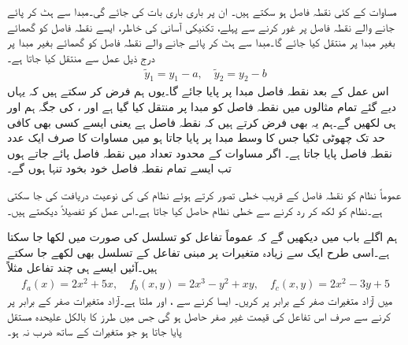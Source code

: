 مساوات  کے کئی نقطہ فاصل ہو سکتے ہیں۔ ان پر باری باری بات کی جائے گی۔مبدا سے ہٹ کر پائے جانے والے نقطہ فاصل پر غور کرنے سے پہلے، تکنیکی آسانی کی خاطر، ایسے نقطہ فاصل کو گھمائے بغیر  مبدا پر منتقل کیا جائے گا۔مبدا  سے ہٹ کر پائے جانے والے نقطہ فاصل  کو گھمائے بغیر  مبدا  پر درج ذیل عمل سے منتقل کیا جاتا ہے۔
\begin{align*}
\tilde{y}_1=y_1-a,\quad \tilde{y}_2=y_2-b
\end{align*}
اس عمل کے بعد نقطہ فاصل  مبدا  پر پایا جائے گا۔یوں ہم فرض کر سکتے ہیں کہ یہاں دیے گئے تمام مثالوں میں نقطہ  فاصل کو مبدا پر منتقل کیا گیا ہے اور  ،  کی جگہ ہم  اور  ہی لکھیں گے۔ہم یہ بھی فرض کرتے ہیں کہ نقطہ فاصل   ہے یعنی ایسے کسی بھی کافی حد تک چھوٹی ٹکیا جس کا وسط مبدا پر پایا جاتا ہو میں مساوات   کا صرف  ایک عدد نقطہ فاصل پایا جاتا ہے۔ اگر مساوات  کے محدود تعداد میں نقطہ فاصل پائے جاتے ہوں تب ایسے تمام نقطہ فاصل خود بخود تنہا ہوں گے۔

عموماً نظام  کو نقطہ فاصل  کے قریب خطی تصور کرتے ہوئے نظام کی  کی نوعیت دریافت کی جا سکتی ہے۔نظام  کو  لکھ کر  رد کرنے سے خطی نظام حاصل کیا جاتا ہے۔اس عمل کو تفصیلاً دیکھتے ہیں۔

ہم اگلے باب میں دیکھیں گے کہ عموماً تفاعل کو تسلسل  کی صورت میں لکھا جا سکتا ہے۔اسی طرح ایک سے زیادہ متغیرات پر مبنی تفاعل کے تسلسل بھی لکھے جا سکتے ہیں۔آئیں ایسے ہی چند تفاعل مثلاً 
\begin{align*}
f_a(x)=2x^2+5x, \quad f_b(x,y)=2x^3-y^2+xy, \quad f_c(x,y)=2x^2-3y+5
\end{align*}
میں آزاد متغیرات صفر کے برابر پر کریں۔ ایسا کرنے سے ،  اور  ملتا ہے۔آزاد متغیرات صفر کے برابر پر کرنے سے صرف اس تفاعل کی قیمت غیر صفر حاصل ہو گی جس میں  طرز کا بالکل علیحدہ مستقل پایا جاتا ہو جو متغیرات کے ساتھ ضرب نہ ہو۔

